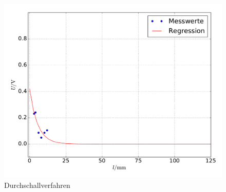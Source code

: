 \documentclass[
  bibliography=totoc,     %
  captions=tableheading,  %
  titlepage=firstiscover, %
]{scrartcl}
\begin{document}
  \begin{figure}
    \centering
    \includegraphics[width=\textwidth]{DurDump.pdf}
    \caption{Durchschallverfahren}
    \label{abb:4}
  \end{figure}
\end{document}
